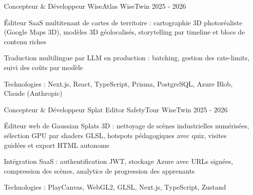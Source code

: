 


\begin{cventries}


\cventry
{Concepteur \& Développeur} %
{WiseAtlas} %
{WiseTwin} %
{2025 - 2026} %
{ %
\begin{cvitems}
\item {Éditeur SaaS multitenant de cartes de territoire : cartographie 3D photoréaliste (Google Maps 3D), modèles 3D géolocalisés, storytelling par timeline et blocs de contenu riches}
\item {Traduction multilingue par LLM en production : batching, gestion des rate-limits, suivi des coûts par modèle}
\item {Technologies : Next.js, React, TypeScript, Prisma, PostgreSQL, Azure Blob, Claude (Anthropic)}
\end{cvitems}
}
\vspace{1.5em}


\cventry
{Concepteur \& Développeur} %
{Splat Editor SafetyTour} %
{WiseTwin} %
{2025 - 2026} %
{ %
\begin{cvitems}
\item {Éditeur web de Gaussian Splats 3D : nettoyage de scènes industrielles numérisées, sélection GPU par shaders GLSL, hotspots pédagogiques avec quiz, visites guidées et export HTML autonome}
\item {Intégration SaaS : authentification JWT, stockage Azure avec URLs signées, compression des scènes, analytics de progression des apprenants}
\item {Technologies : PlayCanvas, WebGL2, GLSL, Next.js, TypeScript, Zustand}
\end{cvitems}
}
\vspace{1.5em}



\end{cventries}

